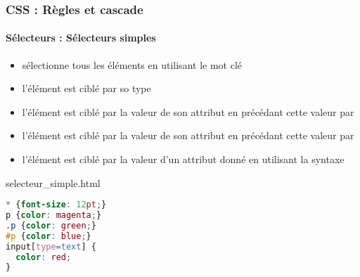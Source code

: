 \documentclass[xcolor=table]{beamer}
\begin{document}
\begin{frame}[fragile]
\frametitle{CSS : Règles et cascade}
\framesubtitle{Sélecteurs : Sélecteurs simples}

\begin{minipage}{0.60\textwidth} 
	\begin{itemize}
		\item {} sélectionne tous les éléments en utilisant le mot clé \keyword{*}
		\item {} l'élément est ciblé par so type
		\item {} l'élément est ciblé par la valeur de son attribut  en précédant cette valeur par 
		\item {} l'élément est ciblé par la valeur de son attribut  en précédant cette valeur par \keyword{\#}
		\item {} l'élément est ciblé par la valeur d'un attribut donné en utilisant la syntaxe 
	\end{itemize}
\end{minipage}
%
\begin{minipage}{0.38\textwidth}
\begin{exampleblock}{selecteur\_simple.html}
\scriptsize\bfseries
\begin{lstlisting}[language={CSS}]
* {font-size: 12pt;}
p {color: magenta;}
.p {color: green;}
#p {color: blue;}
input[type=text] {
  color: red;
}
\end{lstlisting}
\end{exampleblock}
\end{minipage}
\end{frame}
\end{document}
